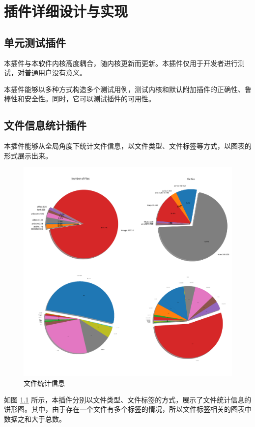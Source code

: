 \chapter{插件详细设计与实现}

\section{单元测试插件}

本插件与本软件内核高度耦合，随内核更新而更新。本插件仅用于开发者进行测试，对普通用户没有意义。

本插件能够以多种方式构造多个测试用例，测试内核和默认附加插件的正确性、鲁棒性和安全性。同时，它可以测试插件的可用性。

\section{文件信息统计插件}

本插件能够从全局角度下统计文件信息，以文件类型、文件标签等方式，以图表的形式展示出来。

\begin{figure}[h]
    \centering
    \includegraphics[width=\textwidth]{figures/pie4.png}
    \caption{文件统计信息}
    \label{fig:pie4}
\end{figure}

如图 \ref{fig:pie4} 所示，本插件分别以文件类型、文件标签的方式，展示了文件统计信息的饼形图。其中，由于存在一个文件有多个标签的情况，所以文件标签相关的图表中数据之和大于总数。


